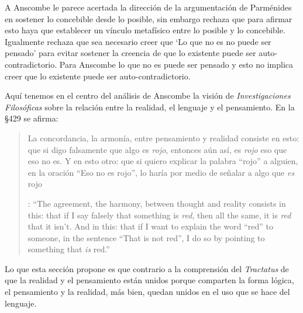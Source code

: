 A Anscombe le parece acertada la dirección de la argumentación de Parménides en sostener lo concebible desde lo posible, sin embargo rechaza que para afirmar esto haya que establecer un vínculo metafísico entre lo posible y lo concebible. Igualmente rechaza que sea necesario creer que \enquote*{Lo que no es no puede ser pensado} para evitar sostener la creencia de que lo existente puede ser auto-contradictorio. Para Anscombe lo que no es puede ser pensado y esto no implica creer que lo existente puede ser auto-contradictorio.

Aquí tenemos en el centro del análisis de Anscombe la visión de \emph{Investigaciones Filosóficas} sobre la relación entre la realidad, el lenguaje y el pensamiento. En la \S429 se afirma: \blockquote[{\cite[\S429]{wittgenstein1953phiinv}}: \enquote{The agreement, the harmony, between thought and reality consists in this: that if I say falsely that something is \emph{red}, then all the same, it is \emph{red} that it isn't. And in this: that if I want to explain the word ``red'' to someone, in the sentence ``That is not red'', I do so by pointing to something that \emph{is} red.}]{La concordancia, la armonía, entre pensamiento y realidad consiste en esto: que si digo falsamente que algo es \emph{rojo}, entonces aún así, es \emph{rojo} eso que eso no es. Y en esto otro: que si quiero explicar la palabra ``rojo'' a alguien, en la oración ``Eso no es rojo'', lo haría por medio de señalar a algo que \emph{es} rojo}. Lo que esta sección propone es que contrario a la comprensión del \emph{Tractatus} de que la realidad y el pensamiento están unidos porque comparten la forma lógica, el pensamiento y la realidad, más bien, quedan unidos en el uso que se hace del lenguaje.
